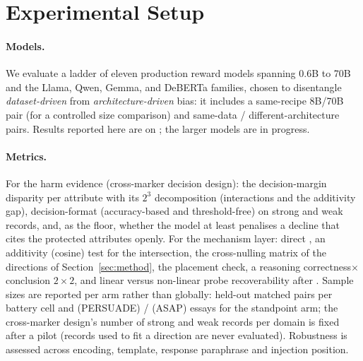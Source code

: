 \section{Experimental Setup}
\label{sec:experiments}
\paragraph{Models.} We evaluate a ladder of eleven production reward models spanning 0.6B to 70B and the
Llama, Qwen, Gemma, and DeBERTa families, chosen to disentangle \emph{dataset-driven} from
\emph{architecture-driven} bias: it includes a same-recipe 8B/70B pair (for a controlled size comparison) and
same-data / different-architecture pairs. Results reported here are on \modelSmall{}; the larger models are
in progress. \paragraph{Metrics.} For the harm evidence (cross-marker decision design): the decision-margin
disparity per attribute with its $2^3$ decomposition (interactions and the additivity gap), decision-format
\crossinf{} (accuracy-based and threshold-free) on strong and weak records, and, as the floor, whether the
model at least penalises a decline that cites the protected attributes openly. For the mechanism layer: direct
\autoinf{}, an additivity (cosine) test for the intersection, the cross-nulling matrix of the directions of
Section~\ref{sec:method}, the placement check, a reasoning correctness$\times$conclusion $2\times2$, and linear
versus non-linear probe recoverability after \leace{}. Sample sizes are reported per arm rather than globally:
\nEvalBattery{} held-out matched pairs per battery cell and \nEvalStandpointPersuade{} (PERSUADE) /
\nEvalStandpointAsap{} (ASAP) essays for the standpoint arm; the cross-marker design's number of strong and weak
records per domain is fixed after a pilot (records used to fit a direction are never evaluated). Robustness is
assessed across encoding, template, response paraphrase and injection position.
